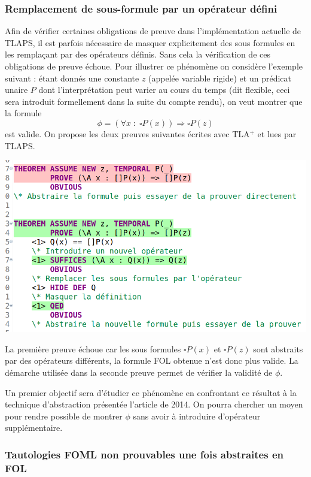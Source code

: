 \documentclass[12pt]{article}
\begin{document}
\subsubsection{Remplacement de sous-formule par un opérateur défini}

Afin de vérifier certaines obligations de preuve dans l'implémentation actuelle de TLAPS, il est parfois nécessaire de masquer explicitement des sous formules en les remplaçant par des opérateurs définis.
Sans cela la vérification de ces obligations de preuve échoue.
Pour illustrer ce phénomène on considère l'exemple suivant :
étant donnés une constante $z$ (appelée variable rigide) et un prédicat unaire $P$ dont l'interprétation peut varier au cours du temps (dit flexible, ceci sera introduit formellement dans la suite du compte rendu), on veut montrer que la formule
\[ \phi = (\forall x \; : \; \square P(x)) \Rightarrow \square P(z) \]
est valide.
On propose les deux preuves suivantes écrites avec TLA$^+$ et lues par TLAPS.
\begin{center}
  \includegraphics[width=0.8\linewidth]{tlaps_operateur}
\end{center}

La première preuve échoue car les sous formules $\square P(x)$ et $\square P(z)$ sont abstraits par des opérateurs différents, la formule FOL obtenue n'est donc plus valide.
La démarche utilisée dans la seconde preuve permet de vérifier la validité de $\phi$.

Un premier objectif sera d'étudier ce phénomène en confrontant ce résultat à la technique d'abstraction présentée l'article de 2014. On pourra chercher un moyen pour rendre possible de montrer $\phi$ sans avoir à introduire d'opérateur supplémentaire.

\subsubsection{Tautologies FOML non prouvables une fois abstraites en FOL}
\end{document}
